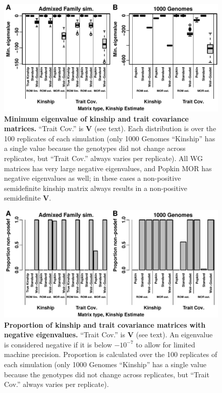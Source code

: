 \documentclass[11pt]{article}
\begin{document}
\begin{figure}[bp!]
  \centering
  \includegraphics[width=\textwidth]{emin.pdf}
  \caption{
    {\bf Minimum eigenvalue of kinship and trait covariance matrices.}
    ``Trait Cov.'' is $\mathbf{V}$ (see text).
    Each distribution is over the 100 replicates of each simulation (only 1000 Genomes ``Kinship'' has a single value because the genotypes did not change across replicates, but ``Trait Cov.'' always varies per replicate).
    All WG matrices has very large negative eigenvalues, and Popkin MOR has negative eigenvalues as well; in these cases a non-positive semidefinite kinship matrix always results in a non-positive semidefinite $\mathbf{V}$.
  }
  \label{fig:emin}
\end{figure}

\begin{figure}[bp!]
  \centering
  \includegraphics[width=\textwidth]{emin-cut.pdf}
  \caption{
    {\bf Proportion of kinship and trait covariance matrices with negative eigenvalues.}
    ``Trait Cov.'' is $\mathbf{V}$ (see text).
    An eigenvalue is considered negative if it is below $-10^{-7}$ to allow for limited machine precision.
    Proportion is calculated over the 100 replicates of each simulation (only 1000 Genomes ``Kinship'' has a single value because the genotypes did not change across replicates, but ``Trait Cov.'' always varies per replicate).
  }
  \label{fig:emin-cut}
\end{figure}
\end{document}

